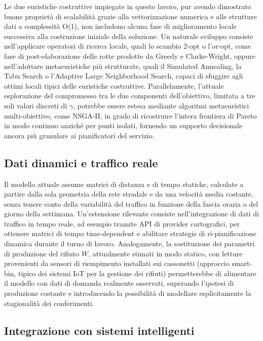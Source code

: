 Le due euristiche costruttive impiegate in questo lavoro, pur avendo dimostrato buone proprietà di scalabilità grazie alla vettorizzazione numerica e alle strutture dati a complessità O(1), non includono alcuna fase di miglioramento locale successiva alla costruzione iniziale della soluzione. Un naturale sviluppo consiste nell'applicare operatori di ricerca locale, quali lo scambio 2-opt o l'or-opt, come fase di post-elaborazione delle rotte prodotte da Greedy e Clarke-Wright, oppure nell'adottare metaeuristiche più strutturate, quali il Simulated Annealing, la Tabu Search o l'Adaptive Large Neighborhood Search, capaci di sfuggire agli ottimi locali tipici delle euristiche costruttive. Parallelamente, l'attuale esplorazione del compromesso tra le due componenti dell'obiettivo, limitata a tre soli valori discreti di $\gamma$, potrebbe essere estesa mediante algoritmi metaeuristici multi-obiettivo, come NSGA-II, in grado di ricostruire l'intera frontiera di Pareto in modo continuo anziché per punti isolati, fornendo un supporto decisionale ancora più granulare ai pianificatori del servizio.

\subsection*{Dati dinamici e traffico reale}

Il modello attuale assume matrici di distanza e di tempo statiche, calcolate a partire dalla sola geometria della rete stradale e da una velocità media costante, senza tenere conto della variabilità del traffico in funzione della fascia oraria o del giorno della settimana. Un'estensione rilevante consiste nell'integrazione di dati di traffico in tempo reale, ad esempio tramite API di provider cartografici, per ottenere matrici di tempo time-dependent e abilitare strategie di ri-pianificazione dinamica durante il turno di lavoro. Analogamente, la sostituzione dei parametri di produzione del rifiuto $W$, attualmente stimati in modo statico, con letture provenienti da sensori di riempimento installati sui cassonetti (approccio smart-bin, tipico dei sistemi IoT per la gestione dei rifiuti) permetterebbe di alimentare il modello con dati di domanda realmente osservati, superando l'ipotesi di produzione costante e introducendo la possibilità di modellare esplicitamente la stagionalità dei conferimenti.

\subsection*{Integrazione con sistemi intelligenti}

